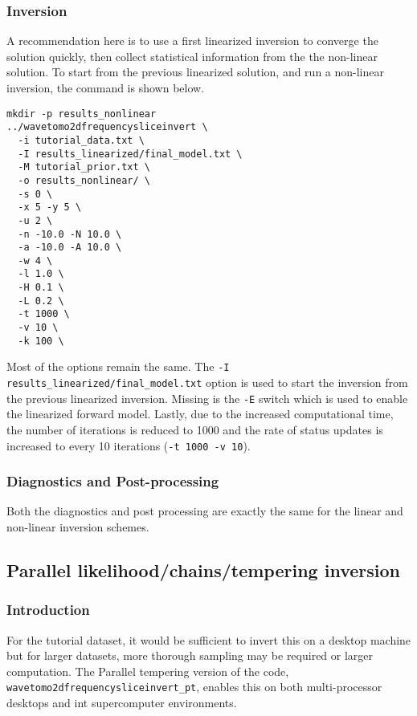 \documentclass[a4paper,12pt]{article}
\begin{document}
\subsubsection{Inversion}

A recommendation here is to use a first linearized inversion to converge
the solution quickly, then collect statistical information from
the the non-linear solution. To start from the previous linearized
solution, and run a non-linear inversion, the command is shown below.

\begin{verbatim}
mkdir -p results_nonlinear
../wavetomo2dfrequencysliceinvert \
  -i tutorial_data.txt \
  -I results_linearized/final_model.txt \
  -M tutorial_prior.txt \
  -o results_nonlinear/ \
  -s 0 \
  -x 5 -y 5 \
  -u 2 \
  -n -10.0 -N 10.0 \
  -a -10.0 -A 10.0 \
  -w 4 \
  -l 1.0 \
  -H 0.1 \
  -L 0.2 \
  -t 1000 \
  -v 10 \
  -k 100 \
\end{verbatim}

Most of the options remain the same. The {\tt -I
  results\_linearized/final\_model.txt} option is used to start the
inversion from the previous linearized inversion.  Missing is the
{\tt -E} switch which is used to enable the linearized forward model.
Lastly, due to the increased computational time, the number of
iterations is reduced to 1000 and the rate of status updates is
increased to every 10 iterations ({\tt -t 1000 -v 10}).

\subsubsection{Diagnostics and Post-processing}

Both the diagnostics and post processing are exactly the same for
the linear and non-linear inversion schemes.

\subsection{Parallel likelihood/chains/tempering inversion}

\subsubsection{Introduction}

For the tutorial dataset, it would be sufficient to invert this on a
desktop machine but for larger datasets, more thorough sampling may be
required or larger computation. The Parallel tempering version of the
code, {\tt wavetomo2dfrequencysliceinvert\_pt}, enables this on both
multi-processor desktops and int supercomputer environments.
\end{document}
